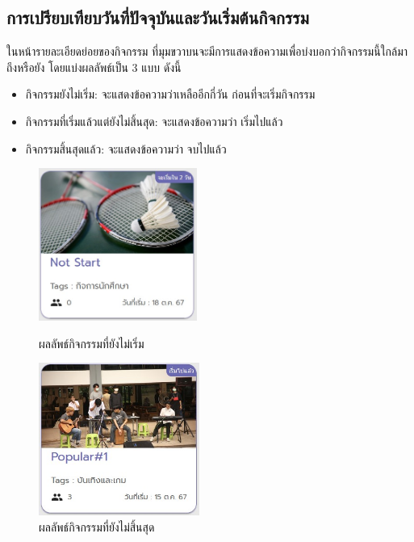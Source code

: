 \subsection{การเปรียบเทียบวันที่ปัจจุบันและวันเริ่มต้นกิจกรรม}
ในหน้ารายละเอียดย่อยของกิจกรรม ที่มุมขวาบนจะมีการแสดงข้อความเพื่อบ่งบอกว่ากิจกรรมนี้ใกล้มาถึงหรือยัง โดยแบ่งผลลัพธ์เป็น 3 แบบ ดังนี้
\begin{itemize}
    \item กิจกรรมยังไม่เริ่ม: จะแสดงข้อความว่าเหลืออีกกี่วัน ก่อนที่จะเริ่มกิจกรรม
    \item กิจกรรมที่เริ่มแล้วแต่ยังไม่สิ้นสุด: จะแสดงข้อความว่า เริ่มไปแล้ว
    \item กิจกรรมสิ้นสุดแล้ว: จะแสดงข้อความว่า จบไปแล้ว
\end{itemize}
\begin{figure}[H]
    \begin{minipage}[b]{0.48\textwidth}
        \includegraphics[width=\textwidth, height=5cm]{public/not-start.jpg}
        \caption[ผลทดลองกิจกรรมที่ยังไม่เริ่ม]{ผลลัพธ์กิจกรรมที่ยังไม่เริ่ม}
    \end{minipage}
    \hfill
    \begin{minipage}[b]{0.48\textwidth}
        \includegraphics[width=\textwidth, height=5cm]{public/already-started.jpg}
        \caption[ผลทดลองกิจกรรมที่เริ่มไปแล้ว]{ผลลัพธ์กิจกรรมที่ยังไม่สิ้นสุด}
    \end{minipage}
\end{figure}
